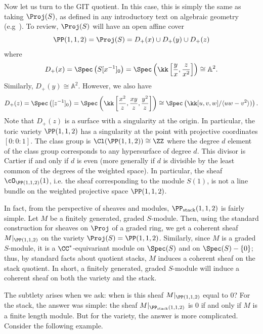 Now let us turn to the GIT quotient.  In this case, this is simply the same as taking $\Proj(S)$, as defined in any introductory text on algebraic geometry (e.g~\cite[Chapter 2]{Hartshorne1977}).  To review, $\Proj(S)$ will have an open affine cover
\[
\PP(1,1,2) = \Proj(S) = D_+(x) \cup D_+(y) \cup D_+(z)
\]
where
\[
D_+(x) = \Spec\left(S[x^{-1}]_0\right)=\Spec\left(\kk\left[\frac{y}{x}, \frac{z}{x^2}\right]\right) \cong \mathbb A^2.
\]
Similarly, $D_+(y) \cong \mathbb A^2$.  However, we also have
\[
D_+(z) =   \Spec\left([z^{-1}]_0\right)=\Spec\left(\kk\left[\frac{x^2}{z}, \frac{xy}{z}, \frac{y^2}{z}\right]\right)\cong \Spec\left(\kk[u,v,w] / \langle uw-v^2 \rangle)\right).
\]
Note that $D_+(z)$ is a surface with a singularity at the origin.  In particular, the toric variety $\PP(1,1,2)$ has a singularity at the point with projective coordinates $[0:0:1]$.    The class group is $\Cl(\PP(1,1,2)) \cong \ZZ$ where the degree $d$ element of the class group corresponds to any hypersurface of degree $d$.  This divisor is Cartier if and only if $d$ is even (more generally if $d$ is divisible by the least common of the degrees of the weighted space).
In particular, the sheaf $\cO_{\PP(1,1,2)}(1)$, i.e. the sheaf corresponding to the module $S(1)$, is not a line bundle on the weighted projective space $\PP(1,1,2)$.


In fact, from the perspective of sheaves and modules, $\PP_{\text{stack}}(1,1,2)$ is fairly simple.  Let $M$ be a finitely generated, graded $S$-module.  Then, using the standard construction for sheaves on $\Proj$ of a graded ring, we get a  coherent sheaf $M|_{\PP(1,1,2)}$ on the variety $\Proj(S) = \PP(1,1,2)$.  Similarly, since $M$ is a graded $S$-module, it is a $\CC^*$-equivariant module on $\Spec(S)$ and on $\Spec(S) - \{0\}$; thus, by standard facts about quotient stacks, $M$ induces a coherent sheaf on the stack quotient.  In short, a finitely generated, graded $S$-module will induce a coherent sheaf on both the variety and the stack.

The subtlety arises when we ask:  when is this sheaf $M|_{\PP(1,1,2)}$ equal to $0$?  For the stack, the answer was simple: the sheaf $M|_{\PP_{\text{stack}}(1,1,2)}$ is $0$ if and only if $M$ is a finite length module.  But
for the variety, the answer is more complicated.  Consider the following example.


